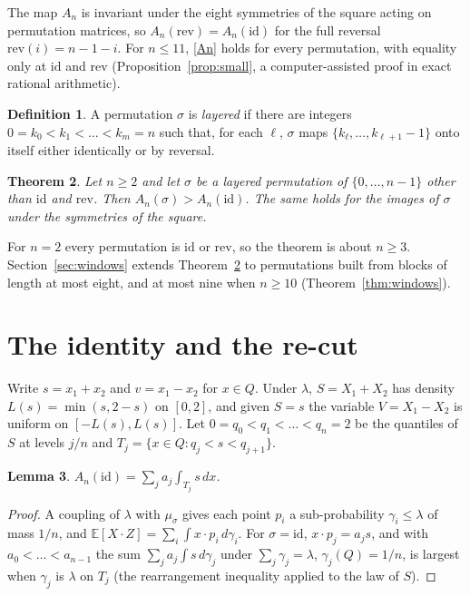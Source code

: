 \documentclass[11pt]{amsart}
\newtheorem{theorem}{Theorem}[section]
\newtheorem{lemma}[theorem]{Lemma}
\theoremstyle{definition}
\newtheorem{definition}[theorem]{Definition}
\theoremstyle{remark}
\numberwithin{equation}{section}
\newcommand{\E}{\mathbb{E}}
\begin{document}
The map $A_n$ is invariant under the eight symmetries of the square acting on permutation matrices, so
$A_n(\mathrm{rev})=A_n(\mathrm{id})$ for the full reversal $\mathrm{rev}(i)=n-1-i$. For $n\le11$, \eqref{An}
holds for every permutation, with equality only at $\mathrm{id}$ and $\mathrm{rev}$ (Proposition~\ref{prop:small}, a
computer-assisted proof in exact rational arithmetic).

\begin{definition}
A permutation $\sigma$ is \emph{layered} if there are integers $0=k_0<k_1<\dots<k_m=n$ such that, for each $\ell$,
$\sigma$ maps $\{k_\ell,\dots,k_{\ell+1}-1\}$ onto itself either identically or by reversal.
\end{definition}

\begin{theorem}\label{thm:main}
Let $n\ge 2$ and let $\sigma$ be a layered permutation of $\{0,\dots,n-1\}$ other than $\mathrm{id}$ and $\mathrm{rev}$.
Then $A_n(\sigma)>A_n(\mathrm{id})$. The same holds for the images of $\sigma$ under the symmetries of the square.
\end{theorem}

For $n=2$ every permutation is $\mathrm{id}$ or $\mathrm{rev}$, so the theorem is about $n\ge 3$. Section~\ref{sec:windows}
extends Theorem~\ref{thm:main} to permutations built from blocks of length at most eight, and at most nine when
$n\ge10$ (Theorem~\ref{thm:windows}).

\section{The identity and the re-cut}\label{sec:recut}

Write $s=x_1+x_2$ and $v=x_1-x_2$ for $x\in Q$. Under $\lambda$, $S=X_1+X_2$ has density
$L(s)=\min(s,2-s)$ on $[0,2]$, and given $S=s$ the variable $V=X_1-X_2$ is uniform on $[-L(s),L(s)]$. Let
$0=q_0<q_1<\dots<q_n=2$ be the quantiles of $S$ at levels $j/n$ and $T_j=\{x\in Q: q_j<s<q_{j+1}\}$.

\begin{lemma}\label{lem:id}
$A_n(\mathrm{id})=\sum_j a_j\int_{T_j}s\,dx$.
\end{lemma}

\begin{proof}
A coupling of $\lambda$ with $\mu_\sigma$ gives each point $p_i$ a sub-probability $\gamma_i\le\lambda$ of mass $1/n$, and
$\E[X\cdot Z]=\sum_i\int x\cdot p_i\,d\gamma_i$. For $\sigma=\mathrm{id}$, $x\cdot p_j=a_js$, and with $a_0<\dots<a_{n-1}$
the sum $\sum_j a_j\int s\,d\gamma_j$ under $\sum_j\gamma_j=\lambda$, $\gamma_j(Q)=1/n$, is largest when $\gamma_j$ is
$\lambda$ on $T_j$ (the rearrangement inequality applied to the law of $S$).
\end{proof}
\end{document}
